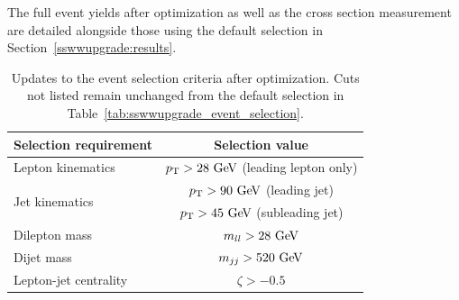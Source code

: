 The full event yields after optimization as well as the cross section measurement are detailed alongside those using the default selection in Section~\ref{sswwupgrade:results}.


\begin{table}[htb]
  \centering
  \begin{tabular}{l|c}
    Selection requirement              & Selection value \\
    \hline\hline
    Lepton kinematics                  & $\pt > 28\gev$ (leading lepton only) \\
    \multirow{2}{*}{Jet kinematics}    & $\pt > 90\gev$ (leading jet) \\
                                       & $\pt > 45\gev$ (subleading jet) \\
    \hline
    Dilepton mass                      & $m_{ll} > 28\gev$ \\
    Dijet mass                         & $m_{jj} > 520\gev$ \\
    Lepton-jet centrality              & $\zeta > -0.5$ \\
    \hline
  \end{tabular}
  \caption{Updates to the \ssww event selection criteria after optimization.  Cuts not listed remain unchanged from the default selection in Table~\ref{tab:sswwupgrade_event_selection}.}
  \label{tab:sswwupgrade_optimized_selection}
\end{table}

